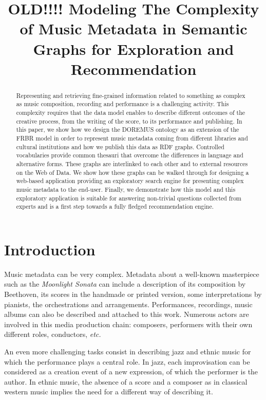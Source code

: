 \documentclass{article}
\title{OLD!!!! Modeling The Complexity of Music Metadata in Semantic Graphs for Exploration and Recommendation}
\begin{document}
\maketitle


\begin{abstract}
Representing and retrieving fine-grained information related to something as complex as music composition, recording and performance is a challenging activity. This complexity requires that the data model enables to describe different outcomes of the creative process, from the writing of the score, to its performance and publishing. In this paper, we show how we design the DOREMUS ontology as an extension of the FRBR model in order to represent music metadata coming from different libraries and cultural institutions and how we publish this data as RDF graphs. Controlled vocabularies provide common thesauri that overcome the differences in language and alternative forms. These graphs are interlinked to each other and to external resources on the Web of Data. We show how these graphs can be walked through for designing a web-based application providing an exploratory search engine for presenting complex music metadata to the end-user. Finally, we demonstrate how this model and this exploratory application is suitable for answering non-trivial questions collected from experts and is a first step towards a fully fledged recommendation engine.
\end{abstract}


\section{Introduction}\label{sec:introduction}
Music metadata can be very complex. Metadata about a well-known masterpiece such as the \textit{Moonlight Sonata} can include a description of its composition by Beethoven, its scores in the handmade or printed version, some interpretations by pianists, the orchestrations and arrangements. Performances, recordings, music albums can also be described and attached to this work. Numerous actors are involved in this media production chain: composers, performers with their own different roles, conductors, {\it etc.}

An even more challenging tasks consist in describing jazz and ethnic music for which the performance plays a central role. In jazz, each improvisation can be considered as a creation event of a new expression, of which the performer is the author. In ethnic music, the absence of a score and a composer as in classical western music implies the need for a different way of describing it.
\end{document}
